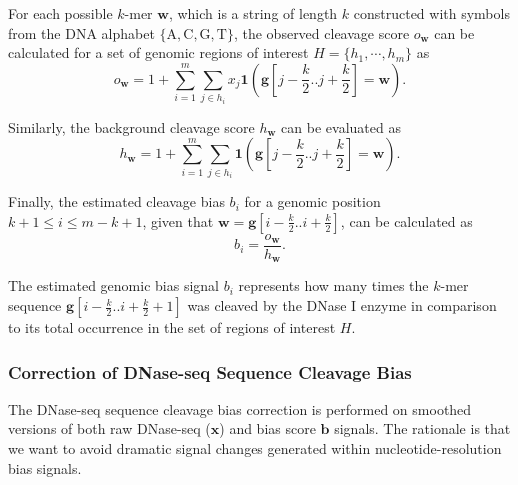 For each possible $k$-mer $\mathbf{w}$, which is a string of length $k$ constructed with symbols from the DNA alphabet $\{\text{A}, \text{C}, \text{G}, \text{T}\}$, the observed cleavage score ${o}_{\mathbf{w}}$ can be calculated for a set of genomic regions of interest $H = \{h_1, \cdots, h_m\}$ as
\begin{equation}
  \label{eq:obscleav}
  {o}_{\mathbf{w}} = 1 + \sum_{i=1}^{m} \sum_{j \in h_i} {x}_{j} \mathbf{1}\left( \mathbf{g}[j-\frac{k}{2} .. j+\frac{k}{2}] = \mathbf{w}\right).
\end{equation}

Similarly, the background cleavage score ${h}_{\mathbf{w}}$ can be evaluated as
\begin{equation}
  \label{eq:backcleav}
  {h}_{\mathbf{w}} = 1 + \sum_{i=1}^{m} \sum_{j \in h_i} \mathbf{1} \left( \mathbf{g}[j-\frac{k}{2} .. j+\frac{k}{2}] = \mathbf{w}\right).
\end{equation}

Finally, the estimated cleavage bias ${b}_{i}$ for a genomic position $k+1 \leq i \leq m-k+1$, given that $\mathbf{w}=\mathbf{g}[i-\frac{k}{2}..i+\frac{k}{2}]$, can be calculated as
\begin{equation}
  \label{eq:cleavbias}
  {b}_{i} = \frac{{o}_{\mathbf{w}}}{{h}_{\mathbf{w}}}.
\end{equation}

The estimated genomic bias signal ${b}_{i}$ represents how many times the $k$-mer sequence $\mathbf{g}[i-\frac{k}{2}..i+\frac{k}{2}+1]$ was cleaved by the DNase I enzyme in comparison to its total occurrence in the set of regions of interest $H$.

\subsubsection{Correction of DNase-seq Sequence Cleavage Bias}
\label{sec:correction.sequence.cleavage.bias}

The DNase-seq sequence cleavage bias correction is performed on smoothed versions of both raw DNase-seq ($\mathbf{x}$) and bias score $\mathbf{b}$ signals. The rationale is that we want to avoid dramatic signal changes generated within nucleotide-resolution bias signals.

